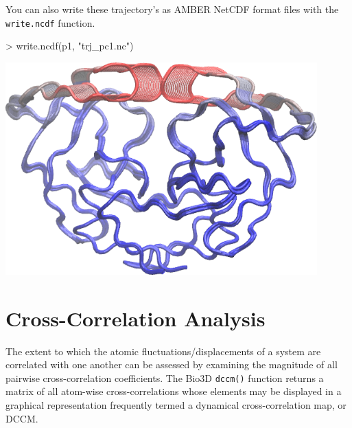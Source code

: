 \documentclass[letter]{article}
\begin{document}
You can also write these trajectory's as AMBER NetCDF format files with the \texttt{write.ncdf} function.
\begin{Schunk}
\begin{Sinput}
> write.ncdf(p1, "trj_pc1.nc")
\end{Sinput}
\end{Schunk}
\begin{center}
\includegraphics[width=120mm]{hiv_pc1.png}
\end{center}


\section{Cross-Correlation Analysis}
The extent to which the atomic fluctuations/displacements of a system are correlated with one another can be assessed by examining the magnitude of all pairwise cross-correlation coefficients. The Bio3D \texttt{dccm()} function returns a matrix of all atom-wise cross-correlations whose elements may be displayed in a graphical representation frequently termed a dynamical cross-correlation map, or DCCM.
\end{document}
